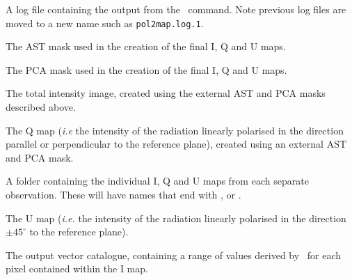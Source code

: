 \begin{aligndesc}
\item[\file{pol2map.log}] A log file containing the output from the
  \poltwomap\ command. Note previous log files are moved to a new name
  such as \texttt{pol2map.log.1}.

\item[\file{astmask.sdf}] The AST mask used in the creation
  of the final I, Q and U maps.

\item[\file{pcamask.sdf}] The PCA mask used in the creation of the
  final I, Q and U maps.

\item[\file{iext.sdf}] The total intensity image, created using the
  external AST and PCA masks described above.

\item[\file{qext.sdf}] The Q map (\emph{i.e} the intensity of the radiation
  linearly polarised in the direction parallel or perpendicular to the
  reference plane), created using an external AST and PCA mask.

\item[\file{maps/}] A folder containing the individual I, Q and U
  maps from each separate observation. These will have names that end with
  ,  or .

\item[\file{uext.sdf}] The U map (\emph{i.e.} the intensity of the radiation
  linearly polarised in the direction $\pm45^{\circ }$ to the reference plane).

\item[\file{mycat.FIT}] The output vector catalogue, containing a
  range of values derived by \poltwomap\ for each pixel contained within
  the I map.

\end{aligndesc}


